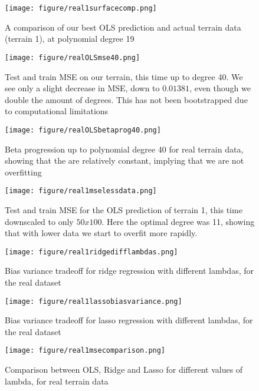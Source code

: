 \documentclass[onecolumn,10pt,cleanfoot]{asme2ej}
\begin{document}
\begin{figure*} 
\centerline{\texttt{[image: figure/real1surfacecomp.png]}}
\caption{A comparison of our best OLS prediction and actual terrain data (terrain 1), at polynomial degree 19}
\label{real1surfacecomp}
\end{figure*}

\begin{figure*}
\centerline{\texttt{[image: figure/realOLSmse40.png]}}
\caption{Test and train MSE on our terrain, this time up to degree 40. We see only a slight decrease in MSE, down to $0.01381$, even though we double the amount of degrees. This has not been bootstrapped due to computational limitations}
\label{realOLSmse40}
\end{figure*}

\begin{figure*}
\centerline{\texttt{[image: figure/realOLSbetaprog40.png]}}
\caption{Beta progression up to polynomial degree 40 for real terrain data, showing that the are relatively constant, implying that we are not overfitting}
\label{realOLSbetaprog40}
\end{figure*}

\begin{figure*}
\centerline{\texttt{[image: figure/real1mselessdata.png]}}
\caption{Test and train MSE for the OLS prediction of terrain 1, this time downscaled to only $50x100$. Here the optimal degree was 11, showing that with lower data we start to overfit more rapidly.}
\label{real1mselessdata}
\end{figure*}

\begin{figure} 
\centerline{\texttt{[image: figure/real1ridgedifflambdas.png]}}
\caption{Bias variance tradeoff for ridge regression with different lambdas, for the real dataset}
\label{real1ridgedifflambdas}
\end{figure}

\begin{figure} 
\centerline{\texttt{[image: figure/real1lassobiasvariance.png]}}
\caption{Bias variance tradeoff for lasso regression with different lambdas, for the real dataset}
\label{real1lassobiasvariance}
\end{figure}

\begin{figure*}
\centerline{\texttt{[image: figure/real1msecomparison.png]}}
\caption{Comparison between OLS, Ridge and Lasso for different values of lambda, for real terrain data}
\label{real1msecomparison}
\end{figure*}
\end{document}
